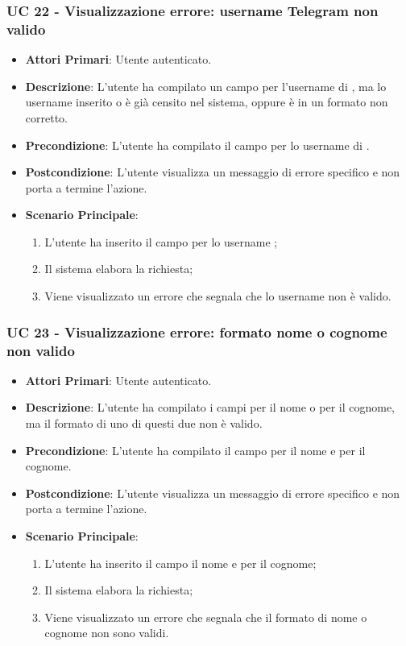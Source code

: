 
		\subsubsection{UC 22 - Visualizzazione errore: username Telegram non valido}
		\begin{itemize}
			\item \textbf{Attori Primari}: Utente autenticato.
			\item \textbf{Descrizione}: L'utente ha compilato un campo per l'username di , ma lo username inserito o è già censito nel sistema, oppure è in un formato non corretto.
			\item \textbf{Precondizione}: L'utente ha compilato il campo per lo username di .
			\item \textbf{Postcondizione}: L'utente visualizza un messaggio di errore specifico e non porta a termine l'azione.
			\item \textbf{Scenario Principale}:
			\begin{enumerate}
				\item L'utente ha inserito il campo per lo username ;
				\item Il sistema elabora la richiesta;
				\item Viene visualizzato un errore che segnala che lo username  non è valido.
			\end{enumerate}
		\end{itemize}



		\subsubsection{UC 23 - Visualizzazione errore: formato nome o cognome non valido}
		\begin{itemize}
			\item \textbf{Attori Primari}: Utente autenticato.
			\item \textbf{Descrizione}: L'utente ha compilato i campi per il nome o per il cognome, ma il formato di uno di questi due non è valido.
			\item \textbf{Precondizione}: L'utente ha compilato il campo per il nome e per il cognome.
			\item \textbf{Postcondizione}: L'utente visualizza un messaggio di errore specifico e non porta a termine l'azione.
			\item \textbf{Scenario Principale}:
			\begin{enumerate}
				\item L'utente ha inserito il campo il nome e per il cognome;
				\item Il sistema elabora la richiesta;
				\item Viene visualizzato un errore che segnala che il formato di nome o cognome non sono validi.
			\end{enumerate}
		\end{itemize}